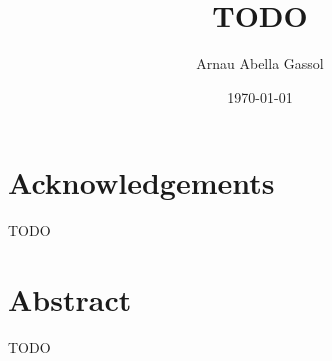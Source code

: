 \documentclass[12pt, a4paper]{report}
\title{TODO}
\author{%
Arnau Abella Gassol
}
\date{\today}
\begin{document}
\maketitle

\chapter*{Acknowledgements}%
TODO

\chapter*{Abstract}%
TODO

\tableofcontents
\listoffigures
\listoftables
\listofalgorithms
{}
\listoflistings
{}


% 
% 
% 

% 
% 
% 

% 

\begin{appendices}

\end{appendices}



\end{document}
